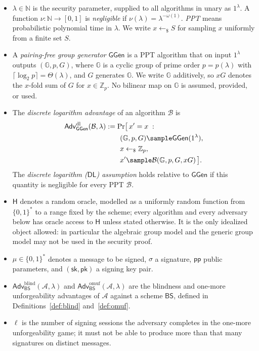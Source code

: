\documentclass{conjura-conjecture}
\newcommand{\BS}{\mathsf{BS}}
\newcommand{\GGen}{\mathsf{GGen}}
\newcommand{\GG}{\mathbb{G}}
\newcommand{\Zp}{\mathbb{Z}_p}
\newcommand{\RO}{\mathsf{H}}
\newcommand{\pubp}{\mathsf{pp}}
\newcommand{\seck}{\mathsf{sk}}
\newcommand{\pubk}{\mathsf{pk}}
\newcommand{\Adv}{\mathsf{Adv}}
\newcommand{\DL}{\mathsf{DL}}
\newcommand{\Adl}{\Adv^{\mathrm{dl}}}
\newcommand{\Ablind}{\Adv^{\mathrm{blind}}}
\newcommand{\Aomuf}{\Adv^{\mathrm{omuf}}}
\newcommand{\rsample}{\leftarrow_{\$}}
\newcommand{\advA}{\mathcal{A}}
\newcommand{\advB}{\mathcal{B}}
\begin{document}
\begin{itemize}
  \item $\lambda \in \mathbb{N}$ is the security parameter, supplied to
  all algorithms in unary as $1^\lambda$. A function
  $\nu : \mathbb{N} \to [0,1]$ is \emph{negligible} if
  $\nu(\lambda) = \lambda^{-\omega(1)}$. \emph{PPT} means probabilistic
  polynomial time in $\lambda$. We write $x \rsample S$ for sampling $x$
  uniformly from a finite set $S$.
  \item A \emph{pairing-free group generator} $\GGen$ is a PPT algorithm
  that on input $1^\lambda$ outputs $(\GG, p, G)$, where $\GG$ is a cyclic
  group of prime order $p = p(\lambda)$ with
  $\lceil \log_2 p \rceil = \Theta(\lambda)$, and $G$ generates $\GG$. We
  write $\GG$ additively, so $xG$ denotes the $x$-fold sum of $G$ for
  $x \in \Zp$. No bilinear map on $\GG$ is assumed, provided, or used.
  \item The \emph{discrete logarithm advantage} of an algorithm $\advB$
  is
  \begin{align*}
    \Adl_{\GGen}(\advB, \lambda) &:= \Pr\bigl[\, x' = x \;:\;\\
    &\qquad (\GG, p, G) \sample \GGen(1^\lambda),\\
    &\qquad x \rsample \Zp,\\
    &\qquad x' \sample \advB(\GG, p, G, xG) \,\bigr].
  \end{align*}
  The \emph{discrete logarithm ($\DL$) assumption} holds relative to
  $\GGen$ if this quantity is negligible for every PPT $\advB$.
  \item $\RO$ denotes a random oracle, modelled as a uniformly random
  function from $\{0,1\}^*$ to a range fixed by the scheme; every
  algorithm and every adversary below has oracle access to $\RO$ unless
  stated otherwise. It is the only idealized object allowed: in
  particular the algebraic group model and the generic group model may
  not be used in the security proof.
  \item $\mu \in \{0,1\}^*$ denotes a message to be signed, $\sigma$ a
  signature, $\pubp$ public parameters, and $(\seck, \pubk)$ a signing key
  pair.
  \item $\Ablind_{\BS}(\advA, \lambda)$ and
  $\Aomuf_{\BS}(\advA, \lambda)$ are the blindness and one-more
  unforgeability advantages of $\advA$ against a scheme $\BS$, defined in
  Definitions~\ref{def:blind} and~\ref{def:omuf}.
  \item $\ell$ is the number of signing sessions the adversary completes
  in the one-more unforgeability game; it must not be able to produce more
  than that many signatures on distinct messages.
\end{itemize}
\end{document}
